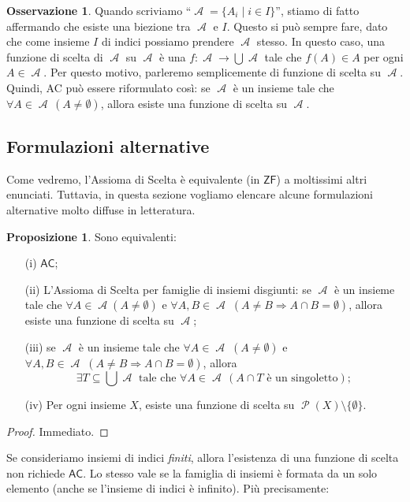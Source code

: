 \documentclass[12pt,a4paper]{report}
\theoremstyle{definition}
\newtheorem{oss}[teo]{Osservazione}  %
\newtheorem{prop}[teo]{Proposizione}  %
\theoremstyle{num.custom-title}
\DeclareMathOperator{\A}{\mathcal{A}}
\DeclareMathOperator{\PP}{\mathcal{P}}
\DeclareMathOperator{\imp}{\Rightarrow}
\DeclareMathOperator{\sm}{\setminus}
\newcommand{\AC}{\ensuremath{\mathsf{AC}}\xspace}
\newcommand{\ZF}{\ensuremath{\mathsf{ZF}}\xspace}
\begin{document}
\begin{oss}
Quando scriviamo ``$\A=\{A_i \mid i \in I\}$'', stiamo di fatto affermando che esiste una biezione tra $\A$ e $I$. Questo si può sempre fare, dato che come insieme $I$ di indici possiamo prendere $\A$ stesso. In questo caso, una funzione di scelta di $\A$ su $\A$ è una $f: \A \to \bigcup \A$ tale che $f(A) \in A$ per ogni $A \in \A$. Per questo motivo, parleremo semplicemente di funzione di scelta su $\A$. Quindi, AC può essere riformulato così: se $\A$ è un insieme tale che $\forall A \in \A \, (A \neq \emptyset)$, allora esiste una funzione di scelta su $\A$.
\end{oss}

\subsection{Formulazioni alternative}

Come vedremo, l'Assioma di Scelta è equivalente (in \ZF) a moltissimi altri enunciati. Tuttavia, in questa sezione vogliamo elencare alcune formulazioni alternative molto diffuse in letteratura.

\begin{prop}\label{formulazioniequiv}
Sono equivalenti:
\begin{itemize}
\item[(i)] \AC;
\item[(ii)] L'Assioma di Scelta per famiglie di insiemi disgiunti: se $\A$ è un insieme tale che $\forall A \in \A (A \neq \emptyset)$ e $\forall A,B \in \A \; (A \neq B \imp A \cap B = \emptyset)$, allora esiste una funzione di scelta su $\A$;
\item[(iii)] se $\A$ è un insieme tale che $\forall A \in \A \; (A \neq \emptyset)$ e $\forall A,B \in \A \; (A \neq B \imp A \cap B = \emptyset)$, allora 
\[
\exists T \subseteq \bigcup \A \text{ tale che } \forall A \in \A \, (A \cap T \text{ è un singoletto});
\]
\item[(iv)] Per ogni insieme $X$, esiste una funzione di scelta su $\PP(X) \sm \{\emptyset\}$.
\end{itemize}
\begin{proof}
Immediato.
\end{proof}
\end{prop}

Se consideriamo insiemi di indici \emph{finiti}, allora l'esistenza di una funzione di scelta non richiede \AC. Lo stesso vale se la famiglia di insiemi è formata da un solo elemento (anche se l'insieme di indici è infinito). Più precisamente:
\end{document}
